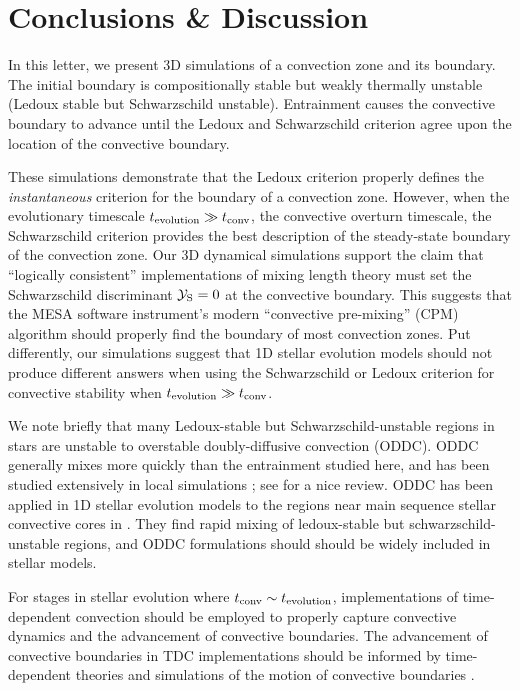 \section{Conclusions \& Discussion}
\label{sec:conclusions}

In this letter, we present 3D simulations of a convection zone and its boundary.
The initial boundary is compositionally stable but weakly thermally unstable (Ledoux stable but Schwarzschild unstable).
Entrainment causes the convective boundary to advance until the Ledoux and Schwarzschild criterion agree upon the location of the convective boundary.

These simulations demonstrate that the Ledoux criterion properly defines the \emph{instantaneous} criterion for the boundary of a convection zone.
However, when the evolutionary timescale $t_{\rm{evolution}} \gg t_{\rm{conv}}$, the convective overturn timescale, the Schwarzschild criterion provides the best description of the steady-state boundary of the convection zone.
Our 3D dynamical simulations support the claim that ``logically consistent'' implementations of mixing length theory \citep{gabriel_etal_2014, mesa4, mesa5} must set the Schwarzschild discriminant $\mathcal{Y}_{\rm{S}} = 0$ at the convective boundary.
This suggests that the MESA software instrument's modern ``convective pre-mixing'' (CPM) algorithm should properly find the boundary of most convection zones.
Put differently, our simulations suggest that 1D stellar evolution models should not produce different answers when using the Schwarzschild or Ledoux criterion for convective stability when $t_{\rm{evolution}} \gg t_{\rm{conv}}$.

We note briefly that many Ledoux-stable but Schwarzschild-unstable regions in stars are unstable to overstable doubly-diffusive convection (ODDC).
ODDC generally mixes more quickly than the entrainment studied here, and has been studied extensively in local simulations \citep{mirouh_etal_2012, wood_etal_2013, xie_etal_2017}; see \citet{garaud_2018} for a nice review.
ODDC has been applied in 1D stellar evolution models to the regions near main sequence stellar convective cores in \citet{moore_garaud_2016}.
They find rapid mixing of ledoux-stable but schwarzschild-unstable regions, and ODDC formulations should should be widely included in stellar models.

For stages in stellar evolution where $t_{\rm{conv}} \sim t_{\rm{evolution}}$, implementations of time-dependent convection \citep[TDC, e.g.,][]{tdc_1986} should be employed to properly capture convective dynamics and the advancement of convective boundaries.
The advancement of convective boundaries in TDC implementations should be informed by time-dependent theories and simulations of the motion of convective boundaries \citep[e.g.,][]{turner_1968, fuentes_cumming_2020}.

